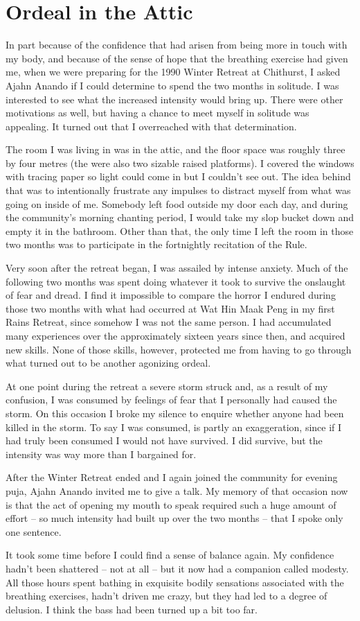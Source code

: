 \chapter{Ordeal in the Attic}

In part because of the confidence that had arisen from being more in
touch with my body, and because of the sense of hope that the breathing
exercise had given me, when we were preparing for the 1990 Winter
Retreat at Chithurst, I asked Ajahn Anando if I could determine to spend
the two months in solitude. I was interested to see what the increased
intensity would bring up. There were other motivations as well, but
having a chance to meet myself in solitude was appealing. It turned out
that I overreached with that determination.

The room I was living in was in the attic, and the floor space was
roughly three by four metres (the were also two sizable raised
platforms). I covered the windows with tracing paper so light could come
in but I couldn't see out. The idea behind that was to intentionally
frustrate any impulses to distract myself from what was going on inside
of me. Somebody left food outside my door each day, and during the
community's morning chanting period, I would take my slop bucket down
and empty it in the bathroom. Other than that, the only time I left the
room in those two months was to participate in the fortnightly
recitation of the Rule.

Very soon after the retreat began, I was assailed by intense anxiety.
Much of the following two months was spent doing whatever it took to
survive the onslaught of fear and dread. I find it impossible to compare
the horror I endured during those two months with what had occurred at
Wat Hin Maak Peng in my first Rains Retreat, since somehow I was not the
same person. I had accumulated many experiences over the approximately
sixteen years since then, and acquired new skills. None of those skills,
however, protected me from having to go through what turned out to be
another agonizing ordeal.

At one point during the retreat a severe storm struck and, as a result
of my confusion, I was consumed by feelings of fear that I personally
had caused the storm. On this occasion I broke my silence to enquire
whether anyone had been killed in the storm. To say I was consumed, is
partly an exaggeration, since if I had truly been consumed I would not
have survived. I did survive, but the intensity was way more than I
bargained for.

After the Winter Retreat ended and I again joined the community for
evening puja, Ajahn Anando invited me to give a talk. My memory of that
occasion now is that the act of opening my mouth to speak required such
a huge amount of effort -- so much intensity had built up over the two
months -- that I spoke only one sentence.

It took some time before I could find a sense of balance again. My
confidence hadn't been shattered -- not at all -- but it now had a
companion called modesty. All those hours spent bathing in exquisite
bodily sensations associated with the breathing exercises, hadn't driven
me crazy, but they had led to a degree of delusion. I think the bass had
been turned up a bit too far.

